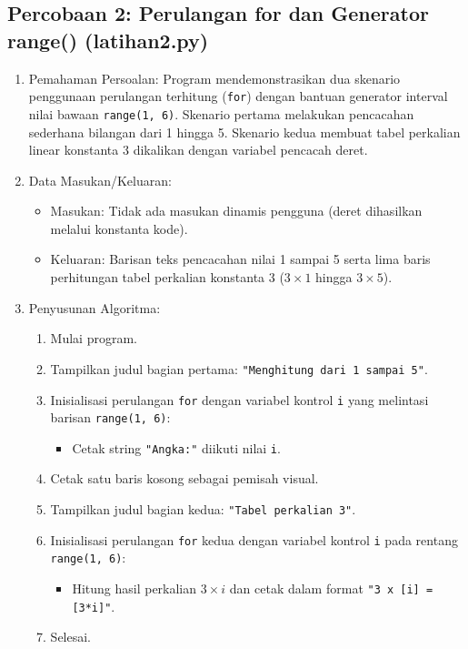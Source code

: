 \documentclass[12pt,a4paper]{article}
\begin{document}
\subsection{Percobaan 2: Perulangan for dan Generator range() (latihan2.py)}
\begin{enumerate}
    \item Pemahaman Persoalan: Program mendemonstrasikan dua skenario penggunaan perulangan terhitung (\texttt{for}) dengan bantuan generator interval nilai bawaan \texttt{range(1, 6)}. Skenario pertama melakukan pencacahan sederhana bilangan dari 1 hingga 5. Skenario kedua membuat tabel perkalian linear konstanta 3 dikalikan dengan variabel pencacah deret.
    \item Data Masukan/Keluaran:
    \begin{itemize}
        \item Masukan: Tidak ada masukan dinamis pengguna (deret dihasilkan melalui konstanta kode).
        \item Keluaran: Barisan teks pencacahan nilai 1 sampai 5 serta lima baris perhitungan tabel perkalian konstanta 3 ($3 \times 1$ hingga $3 \times 5$).
    \end{itemize}
    \item Penyusunan Algoritma:
    \begin{enumerate}[label=\alph*.]
        \item Mulai program.
        \item Tampilkan judul bagian pertama: \texttt{"Menghitung dari 1 sampai 5"}.
        \item Inisialisasi perulangan \texttt{for} dengan variabel kontrol \texttt{i} yang melintasi barisan \texttt{range(1, 6)}:
        \begin{itemize}
            \item Cetak string \texttt{"Angka:"} diikuti nilai \texttt{i}.
        \end{itemize}
        \item Cetak satu baris kosong sebagai pemisah visual.
        \item Tampilkan judul bagian kedua: \texttt{"Tabel perkalian 3"}.
        \item Inisialisasi perulangan \texttt{for} kedua dengan variabel kontrol \texttt{i} pada rentang \texttt{range(1, 6)}:
        \begin{itemize}
            \item Hitung hasil perkalian $3 \times i$ dan cetak dalam format \texttt{"3 x [i] = [3*i]"}.
        \end{itemize}
        \item Selesai.
    \end{enumerate}
\end{enumerate}
\end{document}
